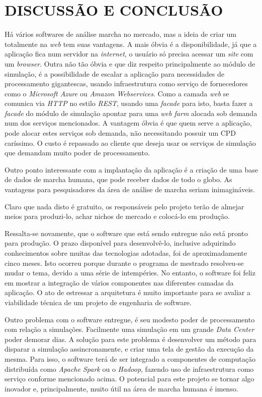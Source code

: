 \chapter[DISCUSSÃO E CONCLUSÃO]{\textbf{DISCUSSÃO E CONCLUSÃO}}

Há vários softwares de análise marcha no mercado, mas a ideia de criar um totalmente na \emph{web} tem suas vantagens. 
A mais óbvia é a disponibilidade, já que a aplicação fica num servidor na \emph{internet}, o usuário só precisa acessar um \emph{site} com um \emph{browser}. 
Outra não tão óbvia e que diz respeito principalmente ao módulo de simulação, é a possibilidade de escalar a aplicação para necessidades de processamento gigantescas, usando infraestrutura como serviço de fornecedores como o \emph{Microsoft Azure} ou \emph{Amazon Webservices}.
Como a camada \emph{web} se comunica via \emph{HTTP} no estilo \emph{REST}, usando uma \emph{facade} para isto, basta fazer a \emph{facade} do módulo de simulação apontar para uma \emph{web farm} alocada sob demanda num dos serviços mencionados. 
A vantagem óbvia é que quem serve a aplicação, pode alocar estes serviços sob demanda, não necessitando possuir um CPD caríssimo. O custo é repassado ao cliente que deseja usar os serviços de simulação que demandam muito poder de processamento.

Outro ponto interessante com a implantação da aplicação é a criação de uma base de dados de marcha humana, que pode receber dados de todo o globo. 
As vantagens para pesquisadores da área de análise de marcha seriam inimagináveis.

Claro que nada disto é gratuito, os responsáveis pelo projeto terão de almejar meios para produzi-lo, achar nichos de mercado e colocá-lo em produção.

Ressalta-se novamente, que o software que está sendo entregue não está pronto para produção. O prazo disponível para desenvolvê-lo, inclusive adquirindo conhecimentos sobre muitas das tecnologias adotadas, foi de aproximadamente cinco meses. 
Isto ocorreu porque durante o programa de mestrado resolveu-se mudar o tema, devido a uma série de intempéries. No entanto, o software foi feliz em mostrar a integração de vários componentes nas diferentes camadas da aplicação. O ato de estressar a arquitetura é muito importante para se avaliar a viabilidade técnica de um projeto de engenharia de software.

Outro problema com o software entregue, é seu modesto poder de processamento com relação a simulações. 
Facilmente uma simulação em um grande \emph{Data Center} poder demorar dias. 
A solução para este problema é desenvolver um método para disparar a simulação assincronamente, e criar uma tela de gestão da execução da mesma. 
Para isso, o software terá de ser integrado a componentes de computação distribuída como \emph{Apache Spark} ou o \emph{Hadoop}, fazendo uso de infraestrutura como serviço conforme mencionado acima. 
O potencial para este projeto se tornar algo inovador e, principalmente, muito útil na área de marcha humana é imenso.

